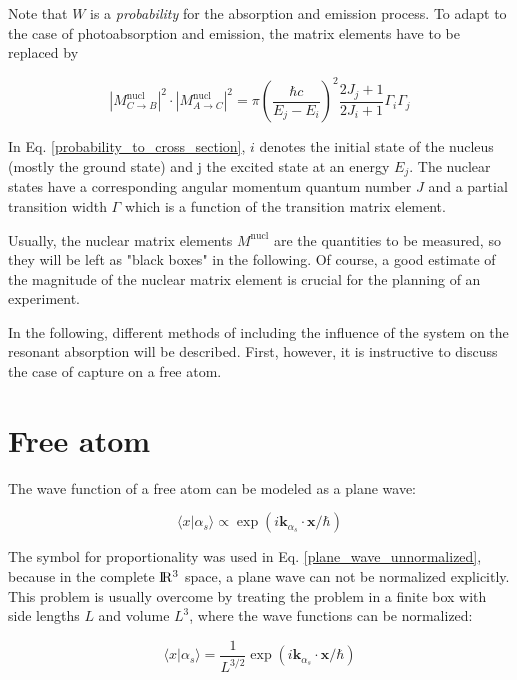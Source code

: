 \documentclass{article}
\begin{document}
Note that $W$ is a \textit{probability} for the absorption and emission process. To adapt to the case of photoabsorption and emission, the matrix elements have to be replaced by \cite{Bet37}

\begin{equation}
	\label{probability_to_cross_section}
	\left| M^{\mathrm{nucl}}_{C \to B} \right|^2 \cdot \left| M^{\mathrm{nucl}}_{A \to C} \right|^2 = \pi \left( \frac{\hbar c}{E_j - E_i} \right)^2 \frac{2 J_j + 1}{2 J_i + 1} \Gamma_i \Gamma_j
\end{equation}

In Eq. \ref{probability_to_cross_section}, $i$ denotes the initial state of the nucleus (mostly the ground state) and j the excited state at an energy $E_j$. The nuclear states have a corresponding angular momentum quantum number $J$ and a partial transition width $\Gamma$ which is a function of the transition matrix element.

Usually, the nuclear matrix elements $M^{\mathrm{nucl}}$ are the quantities to be measured, so they will be left as "black boxes" in the following. 
Of course, a good estimate of the magnitude of the nuclear matrix element is crucial for the planning of an experiment.

In the following, different methods of including the influence of the system on the resonant absorption will be described. First, however, it is instructive to discuss the case of capture on a free atom.

\section{Free atom}
The wave function of a free atom can be modeled as a plane wave:

\begin{equation}
\label{plane_wave_unnormalized}
	\langle x | \alpha_s \rangle \propto \exp{ \left( i \mathbf{k}_{\alpha_s} \cdot \mathbf{x} / \hbar \right) }
\end{equation}

The symbol for proportionality was used in Eq. \ref{plane_wave_unnormalized}, because in the complete $\rm I\!R^3$ space, a plane wave can not be normalized explicitly. 
This problem is usually overcome by treating the problem in a finite box with side lengths $L$ and volume $L^3$, where the wave functions can be normalized:

\begin{equation}
\label{plane_wave_normalized}
	\langle x | \alpha_s \rangle = \frac{1}{L^{ 3/2}} \exp{ \left( i \mathbf{k}_{\alpha_s} \cdot \mathbf{x} / \hbar \right) }
\end{equation}
\end{document}
